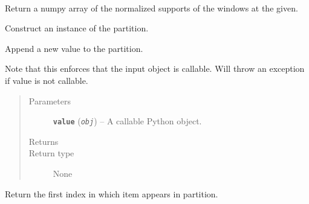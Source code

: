 \documentclass[letterpaper,10pt,english]{sphinxmanual}
\begin{document}
\begin{fulllineitems}
\label{applications/applications.doc:partition.partition}~

\begin{fulllineitems}
\label{applications/applications.doc:partition.partition.__call__}
Return a numpy array of the normalized supports of the windows at the given.

\end{fulllineitems}


\begin{fulllineitems}
\label{applications/applications.doc:partition.partition.__init__}
Construct an instance of the partition.

\end{fulllineitems}


\begin{fulllineitems}
\label{applications/applications.doc:partition.partition.append}
Append a new value to the partition.

Note that this enforces that the input object is callable. Will throw an exception if value is not callable.
\begin{quote}\begin{description}
\item[{Parameters}] \leavevmode
\textbf{\texttt{value}} (\emph{\texttt{obj}}) -- A callable Python object.

\item[{Returns}] \leavevmode


\item[{Return type}] \leavevmode
None

\end{description}\end{quote}

\end{fulllineitems}


\begin{fulllineitems}
\label{applications/applications.doc:partition.partition.index}
Return the first index in which item appears in partition.


\end{fulllineitems}
\end{fulllineitems}
\end{document}
